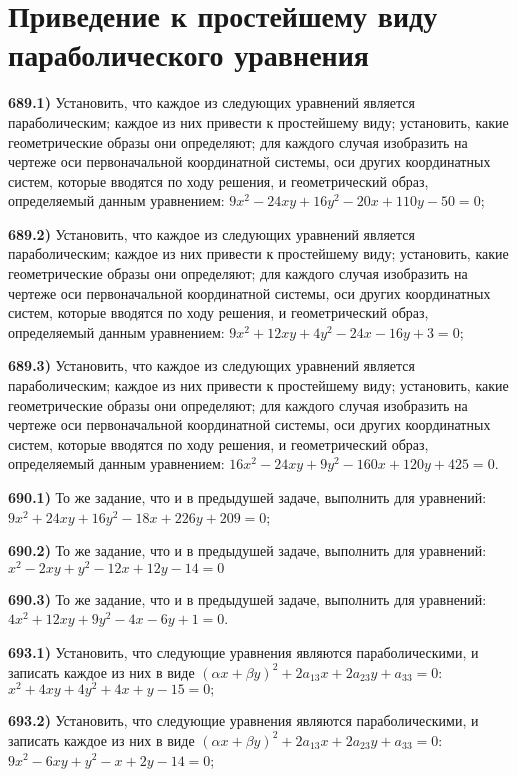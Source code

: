 \section{Приведение к простейшему виду параболического уравнения}



\textbf{689.1)} Установить, что каждое из следующих уравнений является параболическим; каждое из них привести к простейшему виду; установить, какие геометрические образы они определяют; для каждого случая изобразить на чертеже оси первоначальной координатной системы, оси других координатных систем, которые вводятся по ходу решения, и геометрический образ, определяемый данным уравнением: $9 x^2-24 x y+16 y^2-20 x+110 y-50=0$;

\textbf{689.2)} Установить, что каждое из следующих уравнений является параболическим; каждое из них привести к простейшему виду; установить, какие геометрические образы они определяют; для каждого случая изобразить на чертеже оси первоначальной координатной системы, оси других координатных систем, которые вводятся по ходу решения, и геометрический образ, определяемый данным уравнением: $9 x^2+12 x y+4 y^2-24 x-16 y+3=0$;

\textbf{689.3)} Установить, что каждое из следующих уравнений является параболическим; каждое из них привести к простейшему виду; установить, какие геометрические образы они определяют; для каждого случая изобразить на чертеже оси первоначальной координатной системы, оси других координатных систем, которые вводятся по ходу решения, и геометрический образ, определяемый данным уравнением: $16 x^2-24 x y+9 y^2-160 x+120 y+425=0$.

\textbf{690.1)} То же задание, что и в предыдушей задаче, выполнить для уравнений: $9 x^2+24 x y+16 y^2-18 x+226 y+209=0$;

\textbf{690.2)} То же задание, что и в предыдушей задаче, выполнить для уравнений: $x^2-2 x y+y^2-12 x+12 y-14=0$

\textbf{690.3)} То же задание, что и в предыдушей задаче, выполнить для уравнений: $4 x^2+12 x y+9 y^2-4 x-6 y+1=0$.

\textbf{693.1)} Установить, что следующие уравнения являются параболическими, и записать каждое из них в виде $(\alpha x+\beta y)^2+2 a_{13} x+2 a_{23} y+a_{33}=0$: $x^2+4 x y+4 y^2+4 x+y-15=0 ;$

\textbf{693.2)} Установить, что следующие уравнения являются параболическими, и записать каждое из них в виде $(\alpha x+\beta y)^2+2 a_{13} x+2 a_{23} y+a_{33}=0$: $9 x^2-6 x y+y^2-x+2 y-14=0$;

